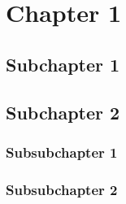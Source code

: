 \section{Chapter 1}

\blindtext

\subsection{Subchapter 1}

\blindtext

\subsection{Subchapter 2}

\blindtext

\subsubsection{Subsubchapter 1}

\blindtext

\subsubsection{Subsubchapter 2}

\blindtext